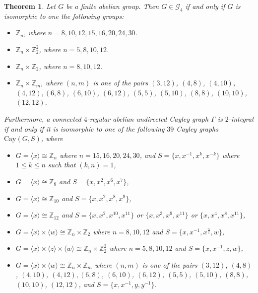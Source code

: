 \documentclass[12pt,a4paper]{article}
\newtheorem{thm}{Theorem}[section]
\def \leq {\leqslant}
\begin{document}
	\begin{thm}\label{4}
		Let $G$ be a finite abelian group. Then $G\in\mathcal{G}_4$ if and only if $G$ is isomorphic to one the following groups:
		\begin{itemize}
			\item[$(1)$] $\mathbb Z_n$, where $n=8,10,12,15,16,20,24,30$.
			\item[$(2)$] $\mathbb Z_n\times\mathbb Z_2^2$, where $n=5,8,10,12$.
			\item[$(3)$] $\mathbb Z_n\times\mathbb Z_2$, where $n=8,10,12$.
			\item[$(4)$] $\mathbb Z_n\times\mathbb Z_m$, where $(n,m)$ is one of the pairs $(3,12)$, $(4,8)$, $(4,10)$, $(4,12), (6,8)$, $(6,10)$, $(6,12)$, $(5,5)$, $(5,10)$, $(8,8)$, $(10,10)$, $(12,12)$.
		\end{itemize}
		Furthermore, a connected $4$-regular abelian undirected Cayley graph $\Gamma$ is $2$-integral if and only if it is isomorphic to one of the  following $39$ Cayley graphs $\mathrm{Cay}(G,S)$, where
		\begin{itemize}
			\item[$\romannumeral1$.] $G=\langle x\rangle \cong \mathbb{Z}_n$ where $n=15,16,20,24,30$, and $S=\{x,x^{-1},x^k,x^{-k}\}$ where $1\leq k\leq n$ such that $(k,n)=1$,
			\item[$\romannumeral2$.] $G=\langle x\rangle \cong \mathbb{Z}_8$ and $S=\{x,x^2,x^6,x^7\}$,		
			\item[$\romannumeral3$.] $G=\langle x\rangle \cong \mathbb{Z}_{10}$ and $S=\{x,x^2,x^8,x^9\}$,
			\item[$\romannumeral4$.] $G=\langle x\rangle \cong \mathbb{Z}_{12}$ and $S=\{x,x^2,x^{10},x^{11}\}$ or $\{x,x^3,x^9,x^{11}\}$ or $\{x,x^4,x^8,x^{11}\}$,
			\item[$\romannumeral5$.] $G=\langle x\rangle\times \langle w\rangle\cong \mathbb{Z}_n\times \mathbb{Z}_2$ where $n=8,10,12$ and $S=\{x,x^{-1},x^{\frac{n}{2}},w\}$,
			\item[$\romannumeral6$.] $G=\langle x\rangle\times \langle z\rangle\times \langle w\rangle\cong \mathbb{Z}_n\times \mathbb{Z}_2^2$ where $n=5,8,10,12$ and $S=\{x,x^{-1},z,w\}$,
			\item[$\romannumeral7$.] $G=\langle x\rangle\times \langle w\rangle\cong \mathbb{Z}_n\times \mathbb{Z}_m$ where $(n,m)$ is one of the pairs $(3,12)$, $(4,8)$, $(4,10)$, $(4,12), (6,8)$, $(6,10)$, $(6,12)$, $(5,5)$, $(5,10)$, $(8,8)$, $(10,10)$, $(12,12)$, and $S=\{x,x^{-1},y,y^{-1}\}$.
		\end{itemize}
	\end{thm}
\end{document}
